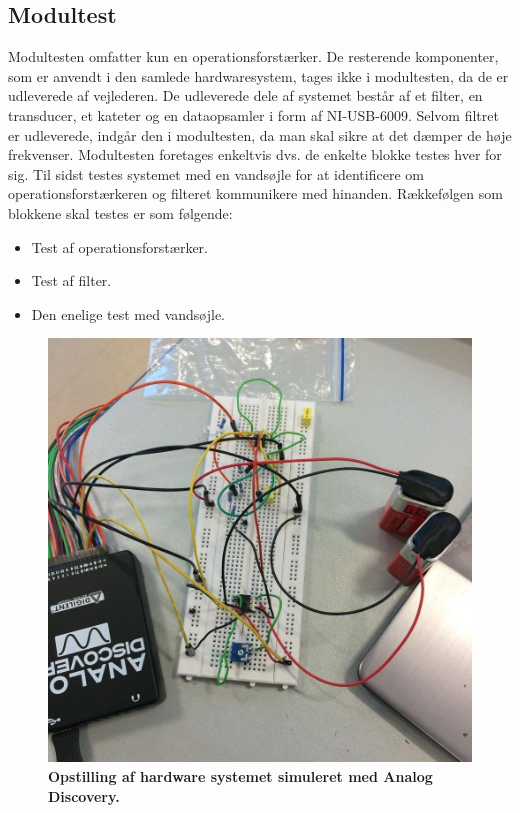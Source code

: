 \subsection{Modultest}
Modultesten omfatter kun en operationsforstærker. De resterende komponenter, som er anvendt i den samlede hardwaresystem, tages ikke i modultesten, da de er udleverede af vejlederen. De udleverede dele af systemet består af et filter, en transducer, et kateter og en dataopsamler i form af NI-USB-6009. Selvom filtret er udleverede, indgår den i modultesten, da man skal sikre at det dæmper de høje frekvenser.  Modultesten foretages enkeltvis dvs. de enkelte blokke testes hver for sig. Til sidst testes systemet med en vandsøjle for at identificere om operationsforstærkeren og filteret kommunikere med hinanden. Rækkefølgen som blokkene skal testes er som følgende:
\begin{itemize}
\item Test af operationsforstærker.
\item Test af filter.
\item Den enelige test med vandsøjle.
\end{itemize}
\begin{figure}[H]
\includegraphics[width =1.0\textwidth , center]{billeder/testOpstilling}
\caption{\textbf{Opstilling af hardware systemet simuleret med Analog Discovery.}}
\end{figure}
